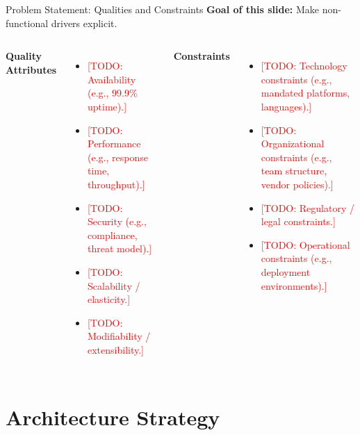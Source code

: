 \documentclass[aspectratio=169]{beamer}
\newcommand{\TODO}[1]{\textcolor{red}{[TODO: #1]}}
\begin{document}
\begin{frame}{Problem Statement: Qualities and Constraints}
  \textbf{Goal of this slide:} Make non-functional drivers explicit.

  \begin{columns}[T]
      \textbf{Quality Attributes}
      \begin{itemize}
        \item \TODO{Availability (e.g., 99.9\% uptime).}
        \item \TODO{Performance (e.g., response time, throughput).}
        \item \TODO{Security (e.g., compliance, threat model).}
        \item \TODO{Scalability / elasticity.}
        \item \TODO{Modifiability / extensibility.}
      \end{itemize}

      \textbf{Constraints}
      \begin{itemize}
        \item \TODO{Technology constraints (e.g., mandated platforms, languages).}
        \item \TODO{Organizational constraints (e.g., team structure, vendor policies).}
        \item \TODO{Regulatory / legal constraints.}
        \item \TODO{Operational constraints (e.g., deployment environments).}
      \end{itemize}
  \end{columns}
\end{frame}

\section{Architecture Strategy}
\end{document}
